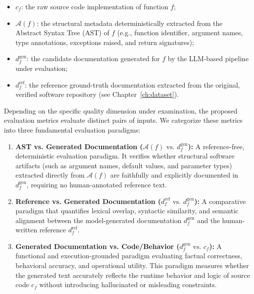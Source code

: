 \begin{itemize} 
\item $c_f$: the raw source code implementation of function $f$; 
\item $\mathcal{A}(f)$: the structural metadata deterministically extracted from the Abstract Syntax Tree (AST) of $f$ (e.g., function identifier, argument names, type annotations, exceptions raised, and return signatures); 
\item $d_f^{\mathrm{gen}}$: the candidate documentation generated for $f$ by the LLM-based pipeline under evaluation; 
\item $d_f^{\mathrm{ref}}$: the reference ground-truth documentation extracted from the original, verified software repository (see Chapter~\ref{ch:dataset}). 
\end{itemize} 

Depending on the specific quality dimension under examination, the proposed evaluation metrics evaluate distinct pairs of inputs. We categorize these metrics into three fundamental evaluation paradigms: 

\begin{enumerate}
	\item \textbf{AST vs. Generated Documentation ($\mathcal{A}(f) \text{ vs. } d_f^{\mathrm{gen}}$):} A reference-free, deterministic evaluation paradigm. It verifies whether structural software artifacts (such as argument names, default values, and parameter types) extracted directly from $\mathcal{A}(f)$ are faithfully and explicitly documented in $d_f^{\mathrm{gen}}$, requiring no human-annotated reference text. 

	\item \textbf{Reference vs. Generated Documentation ($d_f^{\mathrm{ref}} \text{ vs. } d_f^{\mathrm{gen}}$):} A comparative paradigm that quantifies lexical overlap, syntactic similarity, and semantic alignment between the model-generated documentation $d_f^{\mathrm{gen}}$ and the human-written reference $d_f^{\mathrm{ref}}$. 

	\item \textbf{Generated Documentation vs. Code/Behavior ($d_f^{\mathrm{gen}} \text{ vs. } c_f$):} A functional and execution-grounded paradigm evaluating factual correctness, behavioral accuracy, and operational utility. This paradigm measures whether the generated text accurately reflects the runtime behavior and logic of source code $c_f$ without introducing hallucinated or misleading constraints. 
\end{enumerate} 

